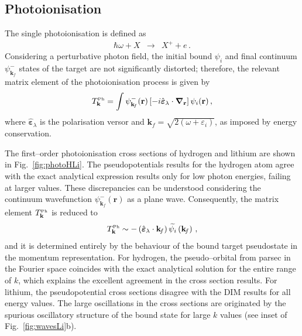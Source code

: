 \documentclass[10pt]{article}
\begin{document}
\subsection{Photoionisation}
\label{sec:photoatom}

The single photoionisation is defined as
\begin{eqnarray}
 \hbar\omega + X &\rightarrow& X^+ + e\,.
\end{eqnarray}
Considering a perturbative photon field, the initial bound $\psi_{i}$ 
and final continuum $\psi_{\mathbf{k}_{\!f}}^-$ states of the target 
are not significantly distorted; therefore, the relevant matrix 
element of the photoionisation process is given by
\begin{equation}
 T_{\mathbf{k}}^{\mbox{\tiny Ph}} = \int{
 \psi_{\mathbf{k}_{\!f}}^-(\mathbf{r}) 
 \left[-i \hat{\boldsymbol{\varepsilon}}_\lambda \cdot 
 \boldsymbol{\nabla}_\mathbf{r}\right] 
 \psi_{i}(\mathbf{r})}\,,
\end{equation}
where $\hat{\boldsymbol{\varepsilon}}_\lambda$ is the polarisation 
versor and $\mathbf{k}_{\!f}=\sqrt{2(\omega+\varepsilon_i)}$, as 
imposed by energy conservation.

The first--order photoionisation cross sections of hydrogen and 
lithium are shown in Fig.~\ref{fig:photoHLi}. The pseudopotentials 
results for the hydrogen atom agree with the exact analytical 
expression results only for low photon energies, failing at larger 
values. These discrepancies can be understood considering the 
continuum wavefunction $\psi_{\mathbf{k}_{\!f}}^-(\mathbf{r})$ as a 
plane wave. Consequently, the matrix element 
$T_{\mathbf{k}}^{\mbox{\tiny Ph}}$ is reduced to
\begin{equation}
 T_{\mathbf{k}}^{\mbox{\tiny Ph}} \sim 
 -\left(\hat{\boldsymbol{\varepsilon}}_\lambda \cdot \mathbf{k}_{\!f} \right)
 \widetilde{\psi_i} \left(\mathbf{k}_{\!f}\right)\,,
\end{equation}
and it is determined entirely by the behaviour of the bound target 
pseudostate in the momentum representation. For hydrogen, the 
pseudo--orbital from {\sc parsec} in the Fourier space coincides with 
the exact analytical solution for the entire range of $k$, which 
explains the excellent agreement in the cross section results. For 
lithium, the pseudopotential cross sections disagree with the DIM 
results for all energy values. The large oscillations in the cross 
sections are originated by the spurious oscillatory structure of the 
bound state for large $k$ values (see inset of 
Fig.~\ref{fig:wavesLi}b).
\end{document}
